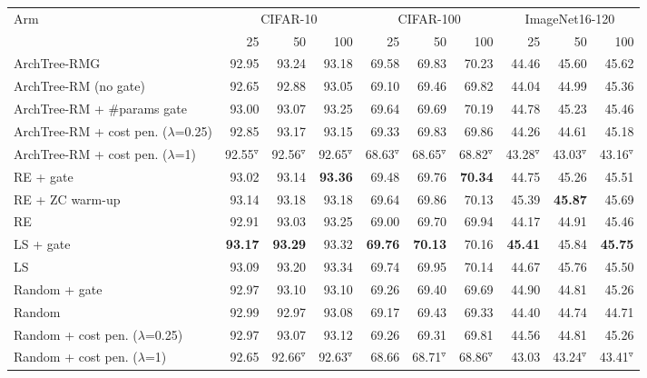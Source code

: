 \begin{tabular}{@{}lrrrrrrrrr@{}}
\toprule
\multirow{2}{*}{Arm} & \multicolumn{3}{c}{CIFAR-10} & \multicolumn{3}{c}{CIFAR-100} & \multicolumn{3}{c}{ImageNet16-120}\\
\cmidrule(lr){2-4}\cmidrule(lr){5-7}\cmidrule(lr){8-10}
 & 25 & 50 & 100 & 25 & 50 & 100 & 25 & 50 & 100\\
\midrule
ArchTree-RMG & 92.95 & 93.24 & 93.18 & 69.58 & 69.83 & 70.23 & 44.46 & 45.60 & 45.62\\
ArchTree-RM (no gate) & 92.65 & 92.88 & 93.05 & 69.10 & 69.46 & 69.82 & 44.04 & 44.99 & 45.36\\
ArchTree-RM + \#params gate & 93.00 & 93.07 & 93.25 & 69.64 & 69.69 & 70.19 & 44.78 & 45.23 & 45.46\\
ArchTree-RM + cost pen. ($\lambda$=0.25) & 92.85 & 93.17 & 93.15 & 69.33 & 69.83 & 69.86 & 44.26 & 44.61 & 45.18\\
ArchTree-RM + cost pen. ($\lambda$=1) & 92.55$^{\triangledown}$ & 92.56$^{\triangledown}$ & 92.65$^{\triangledown}$ & 68.63$^{\triangledown}$ & 68.65$^{\triangledown}$ & 68.82$^{\triangledown}$ & 43.28$^{\triangledown}$ & 43.03$^{\triangledown}$ & 43.16$^{\triangledown}$\\
RE + gate & 93.02 & 93.14 & \textbf{93.36} & 69.48 & 69.76 & \textbf{70.34} & 44.75 & 45.26 & 45.51\\
RE + ZC warm-up & 93.14 & 93.18 & 93.18 & 69.64 & 69.86 & 70.13 & 45.39 & \textbf{45.87} & 45.69\\
RE & 92.91 & 93.03 & 93.25 & 69.00 & 69.70 & 69.94 & 44.17 & 44.91 & 45.46\\
LS + gate & \textbf{93.17} & \textbf{93.29} & 93.32 & \textbf{69.76} & \textbf{70.13} & 70.16 & \textbf{45.41} & 45.84 & \textbf{45.75}\\
LS & 93.09 & 93.20 & 93.34 & 69.74 & 69.95 & 70.14 & 44.67 & 45.76 & 45.50\\
Random + gate & 92.97 & 93.10 & 93.10 & 69.26 & 69.40 & 69.69 & 44.90 & 44.81 & 45.26\\
Random & 92.99 & 92.97 & 93.08 & 69.17 & 69.43 & 69.33 & 44.40 & 44.74 & 44.71\\
Random + cost pen. ($\lambda$=0.25) & 92.97 & 93.07 & 93.12 & 69.26 & 69.31 & 69.81 & 44.56 & 44.81 & 45.26\\
Random + cost pen. ($\lambda$=1) & 92.65 & 92.66$^{\triangledown}$ & 92.63$^{\triangledown}$ & 68.66 & 68.71$^{\triangledown}$ & 68.86$^{\triangledown}$ & 43.03 & 43.24$^{\triangledown}$ & 43.41$^{\triangledown}$\\
\bottomrule
\end{tabular}
